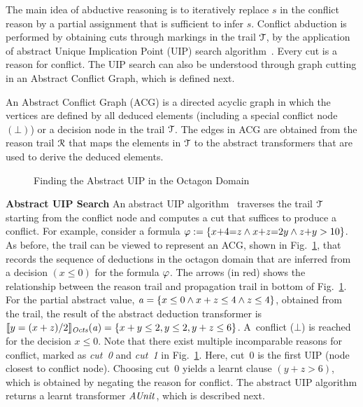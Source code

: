 The main idea of abductive  reasoning is to iteratively replace  $s$  in the conflict reason by a partial assignment that is sufficient 
to infer $s$.  Conflict abduction is performed by obtaining cuts through markings 
in the trail $\mathcal{T}$, by the application of abstract Unique Implication Point (UIP) 
search algorithm~\cite{cdcl}.  Every cut is a reason for conflict.  The UIP
search can also be understood through graph cutting in an Abstract Conflict
Graph, which is defined next. 
\begin{definition}
  An Abstract Conflict Graph (ACG) is a directed acyclic graph in
  which the vertices are defined by all deduced elements (including a
  special conflict node $(\bot)$) or a decision node in the trail
  $\mathcal{T}$.  The edges in ACG are obtained from the reason trail
  $\mathcal{R}$ that maps the elements in $\mathcal{T}$ to the abstract
  transformers that are used to derive the deduced elements.  
\end{definition}
%
\begin{figure}[t]
\centering
{}
\caption{\label{uip}Finding the Abstract UIP in the Octagon Domain}
\end{figure}  
%
\noindent \textbf{Abstract UIP Search}
An abstract UIP algorithm~\cite{DBLP:journals/fmsd/BrainDGHK14} traverses
the trail $\mathcal{T}$ starting from the conflict node and computes a cut that
suffices to produce a conflict.  For example, consider a formula $\varphi:=
\{x{+}4{=}z \wedge x{+}z{=}2y \wedge z{+}y>10\}$.  As before, the trail can be
viewed to represent an ACG, shown in Fig.~\ref{uip}, that records the 
sequence of deductions in the octagon domain that are inferred
from a decision $(x{\leq}0)$ for the formula $\varphi$.  The arrows (in
red) shows the relationship between the reason trail and propagation trail
in bottom of Fig.~\ref{uip}.  For the partial abstract value,
$\mathit{a}=\{x\leq0 \wedge x+z\leq4 \wedge z\leq4\}$, obtained from the trail,
the result of the abstract deduction transformer is
$\llbracket y=(x+z)/2 \rrbracket_{\mathit{Octs}}(\mathit{a})=\{x+y\leq2, y\leq2, y+z\leq6\}$. 
A~conflict ($\bot$) is reached for the decision ${x{\leq}0}$.  Note that
there exist multiple incomparable reasons for conflict, marked as {\em cut~0}
and {\em cut~1} in Fig.~\ref{uip}.  Here, cut~0 is the first UIP (node closest
to conflict node).  Choosing cut~0 yields a learnt clause $(y+z>6)$, which is
obtained by negating the reason for conflict.  The abstract UIP algorithm
returns a learnt transformer $\mathit{AUnit}$, which is described next.\\
%

